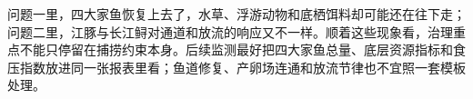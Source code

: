 问题一里，四大家鱼恢复上去了，水草、浮游动物和底栖饵料却可能还在往下走；问题二里，江豚与长江鲟对通道和放流的响应又不一样。顺着这些现象看，治理重点不能只停留在捕捞约束本身。后续监测最好把四大家鱼总量、底层资源指标和食压指数放进同一张报表里看；鱼道修复、产卵场连通和放流节律也不宜照一套模板处理。
